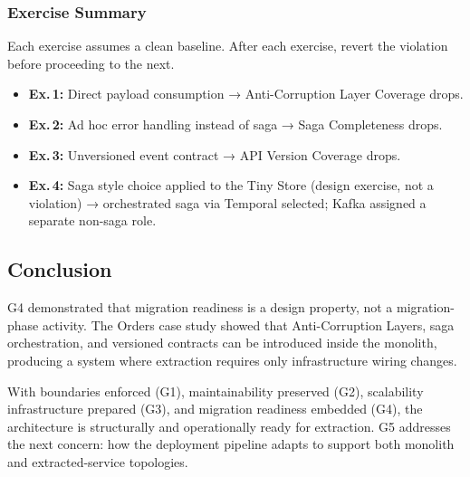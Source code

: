 \subsubsection*{Exercise Summary}
Each exercise assumes a clean baseline. After each exercise, revert the violation before proceeding to the next.
\begin{itemize}[itemsep=2pt,topsep=2pt]
  \item \textbf{Ex.\,1:} Direct payload consumption → Anti-Corruption Layer Coverage drops.
  \item \textbf{Ex.\,2:} Ad hoc error handling instead of saga → Saga Completeness drops.
  \item \textbf{Ex.\,3:} Unversioned event contract → API Version Coverage drops.
  \item \textbf{Ex.\,4:} Saga style choice applied to the Tiny Store (design exercise, not a violation) → orchestrated saga via Temporal selected; Kafka assigned a separate non-saga role.
\end{itemize}

\subsection*{Conclusion}

G4 demonstrated that migration readiness is a design property, not a migration-phase activity. The Orders case study showed that Anti-Corruption Layers, saga orchestration, and versioned contracts can be introduced inside the monolith, producing a system where extraction requires only infrastructure wiring changes.

With boundaries enforced (G1), maintainability preserved (G2), scalability infrastructure prepared (G3), and migration readiness embedded (G4), the architecture is structurally and operationally ready for extraction. G5 addresses the next concern: how the deployment pipeline adapts to support both monolith and extracted-service topologies.
